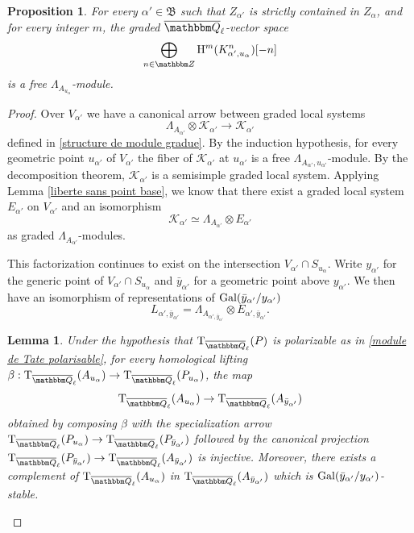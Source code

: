 \documentclass[12pt,english]{smfart}
\numberwithin{equation}{subsection}
\newtheorem{lemma}[equation]{Lemma}
\newtheorem{proposition}[equation]{Proposition}
\theoremstyle{remark}
\newcommand\calK{{\mathcal K}}
\newcommand\rmT{{\rm T}}
\newcommand\FrakB{{\mathfrak B}}
\newcommand\ZZ{{\mathbbm Z}}
\newcommand\QQ{{\mathbbm Q}}
\newcommand\rmH{{\rm H}}
\newcommand\Gal{{\rm Gal}}
\newcommand\Ql{{\overline\QQ_\ell}}
\begin{document}
\begin{proposition}\label{liberte bruit}
For every $\alpha'\in\FrakB$ such that $Z_{\alpha'}$ is strictly contained in $Z_\alpha$, and for every integer $m$, the graded $\Ql$-vector space
$$\bigoplus_{n\in\ZZ}\rmH^m(K^n_{\alpha',u_\alpha})[-n]$$
is a free $\Lambda_{A_{u_\alpha}}$-module.
\end{proposition}

\begin{proof}
Over $V_{\alpha'}$ we have a canonical arrow between graded local systems
$$\Lambda_{A_{\alpha'}}\otimes \calK_{\alpha'}\rightarrow \calK_{\alpha'}$$
defined in \ref{structure de module gradue}. By the induction hypothesis, for every geometric point $u_{\alpha'}$ of $V_{\alpha'}$ the fiber of $\calK_{\alpha'}$ at $u_{\alpha'}$ is a free $\Lambda_{A_{\alpha'},u_{\alpha'}}$-module. By the decomposition theorem, $\calK_{\alpha'}$ is a semisimple graded local system. Applying Lemma \ref{liberte sans point base}, we know that there exist a graded local system $E_{\alpha'}$ on $V_{\alpha'}$ and an isomorphism
$$\calK_{\alpha'}\simeq \Lambda_{A_{\alpha'}}\otimes E_{\alpha'}$$
as graded $\Lambda_{A_{\alpha'}}$-modules.

This factorization continues to exist on the intersection $V_{\alpha'}\cap S_{u_\alpha}$. Write $y_{\alpha'}$ for the generic point of $V_{\alpha'}\cap S_{u_\alpha}$ and $\bar y_{\alpha'}$ for a geometric point above $y_{\alpha'}$. We then have an isomorphism of representations of $\Gal(\bar y_{\alpha'}/y_{\alpha'})$
$$L_{\alpha',\bar y_{\alpha'}}=\Lambda_{A_{\alpha',\bar y_{\alpha'}}}\otimes E_{\alpha',\bar y_{\alpha'}}.$$

\begin{lemma}\label{polarisation injective}
Under the hypothesis that $\rmT_\Ql(P)$ is polarizable as in \ref{module de Tate polarisable}, for every homological lifting $\beta:\rmT_\Ql(A_{u_\alpha})\rightarrow \rmT_\Ql(P_{u_\alpha})$, the map
$$\rmT_\Ql(A_{u_\alpha})\rightarrow \rmT_\Ql(A_{\bar y_{\alpha'}})$$
obtained by composing $\beta$ with the specialization arrow $\rmT_\Ql(P_{u_\alpha})\rightarrow \rmT_\Ql(P_{\bar y_{\alpha'}})$ followed by the canonical projection $\rmT_\Ql(P_{\bar y_{\alpha'}})\rightarrow \rmT_\Ql(A_{\bar y_{\alpha'}})$ is injective. Moreover, there exists a complement of $\rmT_\Ql(A_{u_\alpha})$ in $\rmT_\Ql(A_{\bar y_{\alpha'}})$ which is $\Gal(\bar y_{\alpha'}/y_{\alpha'})$-stable.
\end{lemma}


\end{proof}
\end{document}
